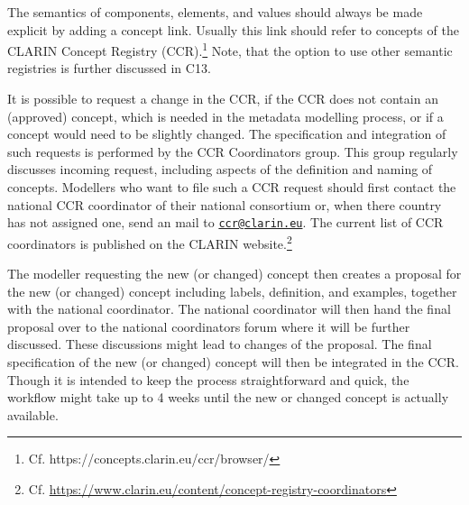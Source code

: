 The semantics of components, elements, and values should always be made explicit by adding a concept link. Usually this link should refer to concepts of the CLARIN Concept Registry (CCR).\footnote{Cf. https://concepts.clarin.eu/ccr/browser/} Note, that the option to use other semantic registries is further discussed in C13.

\begin{workinprogress}
It is possible to request a change in the CCR, if the CCR does not contain an (approved) concept, which is needed in the metadata modelling process, or if a concept would need to be slightly changed. The specification and integration of such requests is performed by the CCR Coordinators group. This group regularly discusses incoming request, including aspects of the definition and naming of concepts. Modellers who want to file such a CCR request should first contact the national CCR coordinator of their national consortium or, when there country has not assigned one, send an mail to \href{mailto:ccr@clarin.eu}{\nolinkurl{ccr@clarin.eu}}. The current list of CCR coordinators is published on the CLARIN website.\footnote{Cf. \url{https://www.clarin.eu/content/concept-registry-coordinators}} 

The modeller requesting the new (or changed) concept then creates a proposal for the new (or changed) concept including labels, definition, and examples, together with the national coordinator. The national coordinator will then hand the final proposal over to the national coordinators forum where it will be further discussed. These discussions might lead to changes of the proposal. The final specification of the new (or changed) concept will then be integrated in the CCR. Though it is intended to keep the process straightforward and quick, the workflow might take up to 4 weeks until the new or changed concept is actually available.
\end{workinprogress}